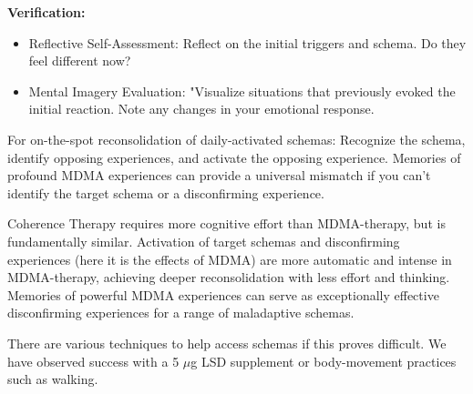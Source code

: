 \documentclass[12pt,letterpaper]{article}
\begin{document}
\noindent \textbf{Verification:}
\begin{itemize}
    \item Reflective Self-Assessment: Reflect on the initial triggers and schema. Do they feel different now?
    \item Mental Imagery Evaluation: "Visualize situations that previously evoked the initial reaction. Note any changes in your emotional response.
\end{itemize}
For on-the-spot reconsolidation of daily-activated schemas: Recognize the schema, identify opposing experiences, and activate the opposing experience. Memories of profound MDMA experiences can provide a universal mismatch if you can't identify the target schema or a disconfirming experience.

Coherence Therapy requires more cognitive effort than MDMA-therapy, but is fundamentally similar. Activation of target schemas and disconfirming experiences (here it is the effects of MDMA) are more automatic and intense in MDMA-therapy, achieving deeper reconsolidation with less effort and thinking. Memories of powerful MDMA experiences can serve as exceptionally effective disconfirming experiences for a range of maladaptive schemas.

There are various techniques to help access schemas if this proves difficult. We have observed success with a 5 $\mu$g LSD supplement or body-movement practices such as walking.
\end{document}
